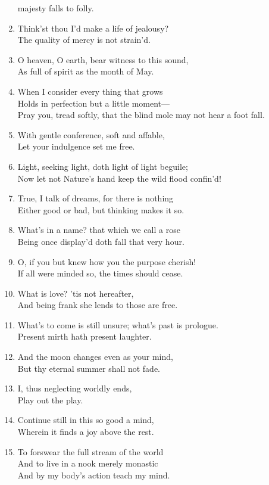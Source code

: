 \documentclass[17pt]{extarticle}
\begin{document}
\begin{enumerate}
  majesty falls to folly.
\item
  Think'st thou I'd make a life of jealousy?\\The quality of mercy is
  not strain'd.
\item
  O heaven, O earth, bear witness to this sound,\\As full of spirit as
  the month of May.
\item
  When I consider every thing that grows\\Holds in perfection but a
  little moment---\\Pray you, tread softly, that the blind mole may not
  hear a foot fall.
\item
  With gentle conference, soft and affable,\\Let your indulgence set me
  free.
\item
  Light, seeking light, doth light of light beguile;\\Now let not
  Nature's hand keep the wild flood confin'd!
\item
  True, I talk of dreams, for there is nothing\\Either good or bad, but
  thinking makes it so.
\item
  What's in a name? that which we call a rose\\Being once display'd doth
  fall that very hour.
\item
  O, if you but knew how you the purpose cherish!\\If all were minded
  so, the times should cease.
\item
  What is love? 'tis not hereafter,\\And being frank she lends to those
  are free.
\item
  What's to come is still unsure; what's past is prologue.\\Present
  mirth hath present laughter.
\item
  And the moon changes even as your mind,\\But thy eternal summer shall
  not fade.
\item
  I, thus neglecting worldly ends,\\Play out the play.
\item
  Continue still in this so good a mind,\\Wherein it finds a joy above
  the rest.
\item
  To forswear the full stream of the world\\And to live in a nook merely
  monastic\\And by my body's action teach my mind.

\end{enumerate}
\end{document}
